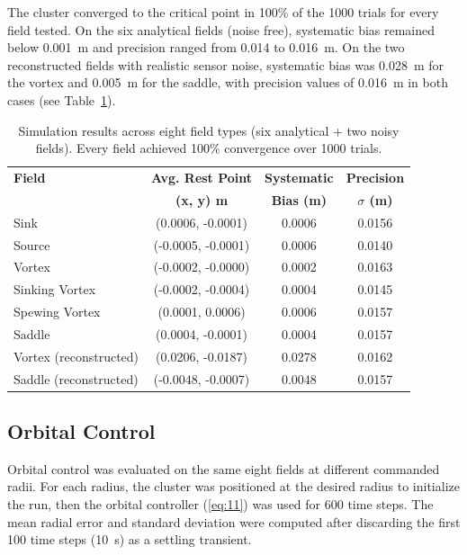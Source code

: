 \documentclass[lettersize,journal]{IEEEtran}
\begin{document}
 The cluster converged to the critical point in 100\% of the 1000 trials for every field tested. On the six analytical fields (noise free), systematic bias remained below 0.001~m and precision ranged from 0.014 to 0.016~m. On the two reconstructed fields with realistic sensor noise, systematic bias was 0.028~m for the vortex and 0.005~m for the saddle, with precision values of 0.016~m in both cases (see Table~\ref{tab:simulation_estimation_results}).


\begin{table}[!t]
\footnotesize
\centering
\caption{Simulation results across eight field types (six analytical + two noisy fields). Every field achieved 100\% convergence over 1000 trials.}
\label{tab:simulation_estimation_results}
\setlength{\tabcolsep}{4pt}
\begin{tabular}{lccc}
\hline
\textbf{Field} & \textbf{Avg. Rest Point} & \textbf{Systematic} & \textbf{Precision} \\
 & \textbf{(x, y) m} & \textbf{Bias (m)} & \textbf{$\sigma$ (m)} \\
\hline
Sink & (0.0006, -0.0001) & 0.0006 & 0.0156 \\
Source & (-0.0005, -0.0001) & 0.0006 & 0.0140 \\
Vortex & (-0.0002, -0.0000) & 0.0002 & 0.0163 \\
Sinking Vortex & (-0.0002, -0.0004) & 0.0004 & 0.0145 \\
Spewing Vortex & (0.0001, 0.0006) & 0.0006 & 0.0157 \\
Saddle & (0.0004, -0.0001) & 0.0004 & 0.0157 \\
Vortex (reconstructed) & (0.0206, -0.0187) & 0.0278 & 0.0162 \\
Saddle (reconstructed) & (-0.0048, -0.0007) & 0.0048 & 0.0157 \\
\hline
\end{tabular}
\end{table}


\subsection{Orbital Control}

Orbital control was evaluated on the same eight fields at different commanded radii. For each radius, the cluster was positioned at the desired radius to initialize the run, then the orbital controller (\ref{eq:11}) was used for 600 time steps. The mean radial error and standard deviation were computed after discarding the first 100 time steps (10~s) as a settling transient.
\end{document}
